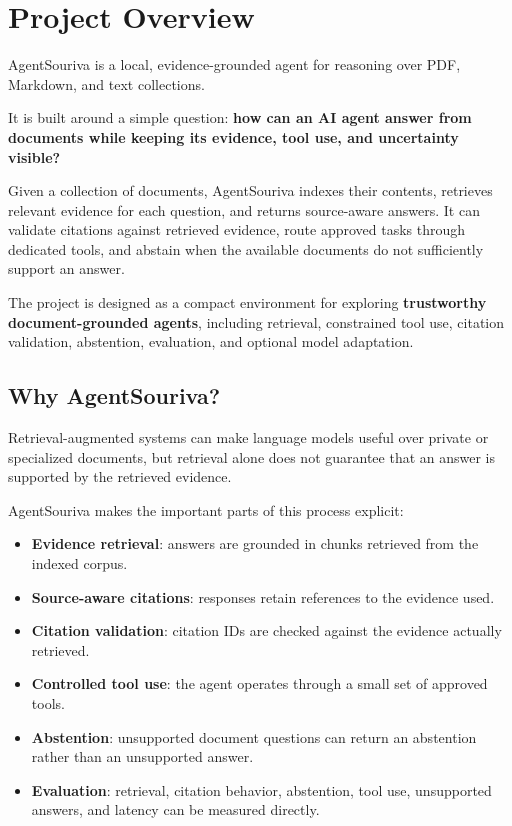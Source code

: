
\section{Project Overview}

AgentSouriva is a local, evidence-grounded agent for reasoning over PDF, Markdown, and text collections.

It is built around a simple question: \textbf{how can an AI agent answer from documents while keeping its evidence, tool use, and uncertainty visible?}

Given a collection of documents, AgentSouriva indexes their contents, retrieves relevant evidence for each question, and returns source-aware answers. It can validate citations against retrieved evidence, route approved tasks through dedicated tools, and abstain when the available documents do not sufficiently support an answer.

The project is designed as a compact environment for exploring \textbf{trustworthy document-grounded agents}, including retrieval, constrained tool use, citation validation, abstention, evaluation, and optional model adaptation.

\subsection{Why AgentSouriva?}

Retrieval-augmented systems can make language models useful over private or specialized documents, but retrieval alone does not guarantee that an answer is supported by the retrieved evidence.

AgentSouriva makes the important parts of this process explicit:

\begin{itemize}
\tightlist
\item
  \textbf{Evidence retrieval}: answers are grounded in chunks retrieved from the indexed corpus.
\item
  \textbf{Source-aware citations}: responses retain references to the evidence used.
\item
  \textbf{Citation validation}: citation IDs are checked against the evidence actually retrieved.
\item
  \textbf{Controlled tool use}: the agent operates through a small set of approved tools.
\item
  \textbf{Abstention}: unsupported document questions can return an abstention rather than an unsupported answer.
\item
  \textbf{Evaluation}: retrieval, citation behavior, abstention, tool use, unsupported answers, and latency can be measured directly.
\end{itemize}


